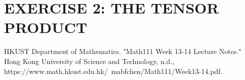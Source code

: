 \documentclass{article}
\begin{document}
\section*{EXERCISE 2: THE TENSOR PRODUCT}
\begin{thebibliography}{99}
    HKUST Department of Mathematics. 
    "Math111 Week 13-14 Lecture Notes." 
    Hong Kong University of Science and Technology, n.d., 
    https://www.math.hkust.edu.hk/~mabfchen/Math111/Week13-14.pdf.
\end{thebibliography}
\end{document}

